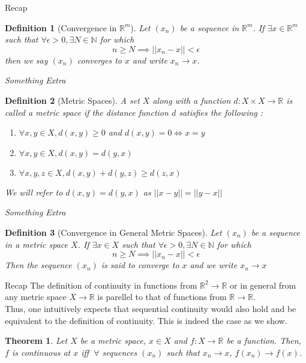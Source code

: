 \documentclass[handout,aspectratio=169]{beamer}
\newtheorem{thm}{Theorem}
\newtheorem{df}{Definition}
\newcommand{\bN}{\mathbb{N}}
\newcommand{\bR}{\mathbb{R}}
\newcommand{\normtwo}[1]{||#1||}
\begin{document}
\begin{frame}{Recap}
 {
\begin{df}[Convergence in $\bR^m$]
Let $(x_n)$ be a sequence in $\bR^m$. If $\exists x \in \bR^m$ such that $\forall \epsilon>0, \exists N \in \bN$ for which
$$n\geq N \implies \normtwo{x_n-x}<\epsilon$$
then we say $(x_n)$ converges to $x$ and write $x_n \to x$.
\end{df}
}
\end{frame}

\begin{frame}{\textit{Something Extra}}
 {
\begin{df}[Metric Spaces]
A set $X$ along with a function $d:X\times X \to \bR$ is called a metric space if the distance function $d$ satisfies the following :
\begin{enumerate}
\item $\forall x,y\in X, d(x,y)\geq 0$ and $d(x,y)=0 \Leftrightarrow x=y$
\item $\forall x,y\in X, d(x,y) = d(y,x)$
\item $\forall x,y,z\in X, d(x,y) + d(y,z) \geq d(z,x)$
\end{enumerate}
We will refer to $d(x,y) = d(y,x)$ as $\normtwo{x-y} = \normtwo{y-x}$
\end{df}
}
\end{frame}

\begin{frame}{\textit{Something Extra}}
 {
\begin{df}[Convergence in General Metric Spaces]
Let $(x_n)$ be a sequence in a metric space $X$. If $\exists x \in X$ such that $\forall \epsilon>0, \exists N \in \bN$ for which $$n\geq N \implies \normtwo{x_n-x}<\epsilon$$
Then the sequence $(x_n)$ is said to converge to $x$ and we write $x_n \to x$\\
\end{df}
}
\end{frame}

\begin{frame}{Recap}
 {
	The definition of continuity in functions from $\bR^2\to\bR$ or in general from any metric space $X\to\bR$ is parellel to that of functions from $\bR\to\bR$.\\
}
 {
    Thus, one intuitively expects that sequential continuity would also hold and be equivalent to the definition of continuity. This is indeed the case as we show.
}
 {
    \begin{thm}
    Let $X$ be a metric space, $x\in X$ and $f:X\to\bR$ be a function. Then, $f$ is continuous at $x$ iff $~\forall$ sequences $(x_n)$ such that $x_n \to x$, $f(x_n) \to f(x)$.
    \end{thm}
}
\end{frame}
\end{document}
